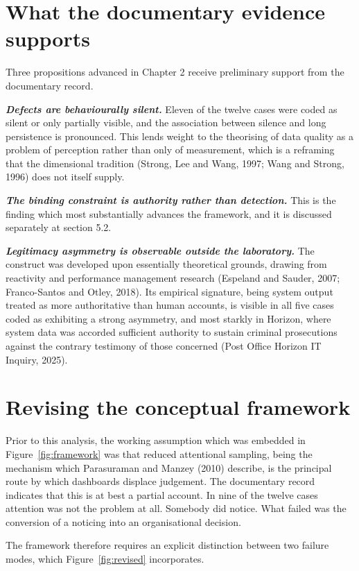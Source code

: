 \documentclass[12pt,a4paper]{article}
\begin{document}
\section{What the documentary evidence supports}

Three propositions advanced in Chapter 2 receive preliminary support from the documentary record.

\textbf{\emph{Defects are behaviourally silent.}} Eleven of the twelve cases were coded as silent or only
partially visible, and the association between silence and long persistence is pronounced. This lends
weight to the theorising of data quality as a problem of perception rather than only of measurement, which
is a reframing that the dimensional tradition (Strong, Lee and Wang, 1997; Wang and Strong, 1996) does not
itself supply.

\textbf{\emph{The binding constraint is authority rather than detection.}} This is the finding which most
substantially advances the framework, and it is discussed separately at section 5.2.

\textbf{\emph{Legitimacy asymmetry is observable outside the laboratory.}} The construct was developed upon
essentially theoretical grounds, drawing from reactivity and performance management research (Espeland and
Sauder, 2007; Franco-Santos and Otley, 2018). Its empirical signature, being system output treated as more
authoritative than human accounts, is visible in all five cases coded as exhibiting a strong asymmetry, and
most starkly in Horizon, where system data was accorded sufficient authority to sustain criminal
prosecutions against the contrary testimony of those concerned (Post Office Horizon IT Inquiry, 2025).

\section{Revising the conceptual framework}

Prior to this analysis, the working assumption which was embedded in Figure~\ref{fig:framework} was that
reduced attentional sampling, being the mechanism which Parasuraman and Manzey (2010) describe, is the
principal route by which dashboards displace judgement. The documentary record indicates that this is at
best a partial account. In nine of the twelve cases attention was not the problem at all. Somebody did
notice. What failed was the conversion of a noticing into an organisational decision.

The framework therefore requires an explicit distinction between two failure modes, which
Figure~\ref{fig:revised} incorporates.
\end{document}
